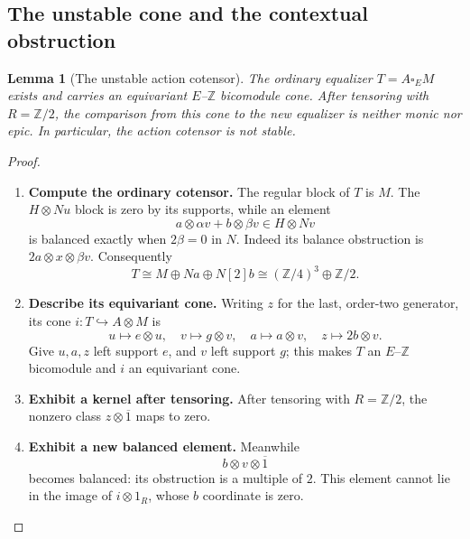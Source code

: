 \documentclass[11pt,reqno]{amsart}
\theoremstyle{plain}
\newtheorem{lemma}[theorem]{Lemma}
\theoremstyle{definition}
\theoremstyle{remark}
\numberwithin{equation}{section}
\newcommand{\Z}{\mathbb Z}
\begin{document}
\subsection{The unstable cone and the contextual obstruction}

\begin{lemma}[The unstable action cotensor]\label{strong:lem:unstable-cotensor}
The ordinary equalizer $T=A\square_E M$ exists and carries an
equivariant $E$--$\Z$ bicomodule cone. After tensoring with $R=\Z/2$,
the comparison from this cone to the new equalizer is neither monic
nor epic. In particular, the action cotensor is not stable.
\end{lemma}
\begin{proof}\leavevmode
\begin{enumerate}
\item \textbf{Compute the ordinary cotensor.} The regular block of $T$ is
$M$. The $H\otimes Nu$ block is zero by its supports, while an element
\[
a\otimes\alpha v+b\otimes\beta v\in H\otimes Nv
\]
is balanced exactly when $2\beta=0$ in $N$. Indeed its balance
obstruction is $2a\otimes x\otimes\beta v$. Consequently
\begin{equation}\label{strong:eq:badcotensor}
T\cong M\oplus Na\oplus N[2]b
\cong(\Z/4)^3\oplus\Z/2.
\end{equation}

\item \textbf{Describe its equivariant cone.} Writing $z$ for the last, order-two generator, its cone
$i:T\hookrightarrow A\otimes M$ is
\begin{equation}\label{strong:eq:badcone}
u\longmapsto e\otimes u,\quad
v\longmapsto g\otimes v,\quad
a\longmapsto a\otimes v,\quad
z\longmapsto2b\otimes v.
\end{equation}
Give $u,a,z$ left support $e$, and $v$ left support $g$; this makes
$T$ an $E$--$\Z$ bicomodule and $i$ an equivariant cone.

\item \textbf{Exhibit a kernel after tensoring.} After tensoring with $R=\Z/2$, the nonzero class
$z\otimes\overline1$ maps to zero.

\item \textbf{Exhibit a new balanced element.} Meanwhile
\begin{equation}\label{strong:eq:newbalanced}
b\otimes v\otimes\overline1
\end{equation}
becomes balanced: its obstruction is a multiple of $2$. This element
cannot lie in the image of $i\otimes1_R$, whose $b$ coordinate is zero.


\end{enumerate}
\end{proof}
\end{document}
